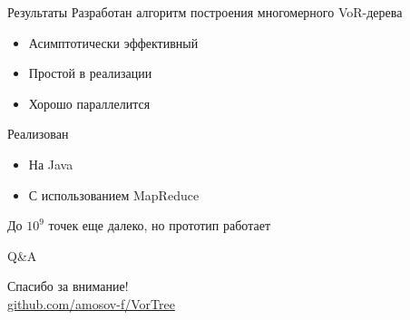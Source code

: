 \documentclass[14pt, fleqn, xcolor={dvipsnames, table}]{beamer}
\begin{document}
        \begin{frame}{Результаты}
            Разработан алгоритм построения многомерного VoR-дерева
            \begin{itemize}
                \item Асимптотически эффективный
                \item Простой в реализации
                \item Хорошо параллелится
            \end{itemize}
            Реализован
            \begin{itemize}
                \item На Java
                \item С использованием MapReduce
            \end{itemize}
            До $10^9$ точек еще далеко, но прототип работает
        \end{frame}
        
        \begin{frame}{Q\&A}
            \begin{center}
                Спасибо за внимание!\\
                \href{https://github.com/amosov-f/VorTree}{github.com/amosov-f/VorTree}
            \end{center}
        \end{frame}
        
\end{document}
